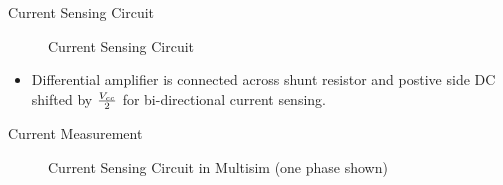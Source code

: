 
\begin{frame}{Current Sensing Circuit}
	\begin{figure}
		\centering


		\caption{Current Sensing Circuit}
	\end{figure}


	\begin{itemize}
		\item Differential amplifier is connected across shunt resistor and postive side DC shifted by $V_{cc}\over 2$ for bi-directional current sensing.
	\end{itemize}
\end{frame}

\begin{frame}{Current Measurement}
	\begin{figure}
		\centering


		\caption{Current Sensing Circuit in Multisim (one phase shown)}
	\end{figure}
\end{frame}


